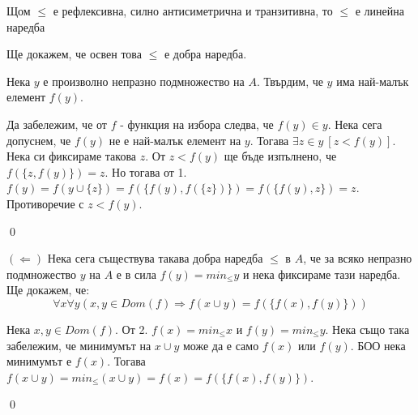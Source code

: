 \quad
Щом $\leq$ е рефлексивна, силно антисиметрична и транзитивна, то $\leq$ е линейна наредба

\quad
Ще докажем, че освен това $\leq$ е добра наредба.

\quad
Нека $y$ е произволно непразно подмножество на $A$. Твърдим, че $y$ има най-малък елемент $f(y)$.

\begin{tcolorbox}[mybox, title={Доказателство:}]
\quad
Да забележим, че от $f$ - функция на избора следва, че $f(y) \in y$.
Нека сега допуснем, че $f(y)$ не е най-малък елемент на $y$. Тогава
$\exists z \in y\ [z < f(y)]$.
Нека си фиксираме такова $z$.
От $z < f(y)$ ще бъде изпълнено, че $f(\{z, f(y)\}) = z$.
Но тогава от 1.
$f(y) = f(y \cup \{z\}) = f(\{f(y), f(\{z\})\}) = f(\{f(y), z\}) = z$.
Противоречие с $z < f(y)$.

\qed
\end{tcolorbox}

\bigbreak
\quad
$(\Leftarrow)$
Нека сега съществува такава добра наредба $\leq$ в $A$, че за всяко непразно подмножество $y$ на $A$ е в сила $f(y) = min_{\leq} y$
и нека фиксираме тази наредба.
Ще докажем, че:
\[
\forall x \forall y (x, y \in Dom(f) \Rightarrow f(x \cup y) = f(\{ f(x), f(y) \}) )
\]

\begin{tcolorbox}[mybox, title={Доказателство:}]
\quad
Нека $x, y \in Dom(f)$.
От 2. $f(x) = min_{\leq} x$ и $f(y) = min_{\leq} y$.
Нека също така забележим, че минимумът на $x \cup y$ може да е само $f(x)$ или $f(y)$.
БОО нека минимумът е $f(x)$.
Тогава $f(x \cup y) = min_{\leq} (x \cup y) = f(x) = f(\{f(x), f(y)\})$.

\qed
\end{tcolorbox}
